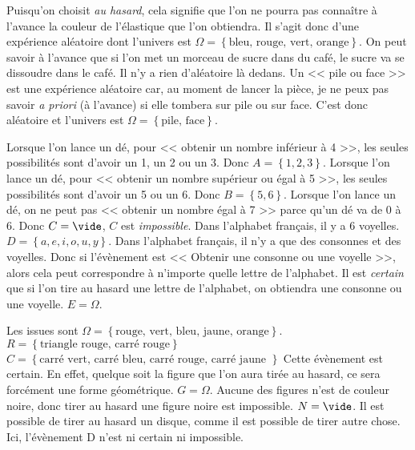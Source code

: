 \documentclass[../Cours.tex]{subfiles}
\begin{document}
\clearpage
\CORRECTIONS
\begin{questions}
    \exercice 
    \question Puisqu'on choisit \textit{au hasard}, cela signifie que l'on ne pourra pas connaître à l'avance la couleur de l'élastique que l'on obtiendra. Il s'agit donc d'une expérience aléatoire dont l'univers est $\Omega = \left\{ \mbox{bleu, rouge, vert, orange} \right\}$.
    \question On peut savoir à l'avance que si l'on met un morceau de sucre dans du café, le sucre va se dissoudre dans le café. Il n'y a rien d'aléatoire là dedans.
    \question Un << pile ou face >> est une expérience aléatoire car, au moment de lancer la pièce, je ne peux pas savoir \textit{a priori} (à l'avance) si elle tombera sur pile ou sur face. C'est donc aléatoire et l'univers est $\Omega = \left\{ \mbox{pile, face} \right\}$.

    \exercice 
    \question 
        \subquestion Lorsque l'on lance un dé, pour << obtenir un nombre inférieur à 4 >>, les seules possibilités sont d'avoir un 1, un 2 ou un 3. Donc $A = \left\{ 1, 2, 3 \right\}$.
        \subquestion Lorsque l'on lance un dé, pour << obtenir un nombre supérieur ou égal à 5 >>, les seules possibilités sont d'avoir un 5 ou un 6. Donc $B = \left\{ 5, 6 \right\}$.
        \subquestion Lorsque l'on lance un dé, on ne peut pas << obtenir un nombre égal à 7 >> parce qu'un dé va de 0 à 6. Donc $C = \vide$, $C$ est \emph{impossible}.
    \question 
        \subquestion Dans l'alphabet français, il y a 6 voyelles. $D = \left\{ a, e, i, o, u, y \right\}$.
        \subquestion Dans l'alphabet français, il n'y a que des consonnes et des voyelles. Donc si l'évènement est << Obtenir une consonne ou une voyelle >>, alors cela peut correspondre à n'importe quelle lettre de l'alphabet. Il est \textit{certain} que si l'on tire au hasard une lettre de l'alphabet, on obtiendra une consonne ou une voyelle. $E = \Omega$.

    \exercice
    \question Les issues sont $\Omega = \left\{ \mbox{rouge, vert, bleu, jaune, orange} \right\}$.
    \question 
        \subquestion $R = \left\{ \mbox{triangle rouge, carré rouge} \right\}$
        \subquestion $C = \left\{ \mbox{carré vert, carré bleu, carré rouge, carré jaune }\right\}$
    \question 
        \subquestion Cette évènement est certain. En effet, quelque soit la figure que l'on aura tirée au hasard, ce sera forcément une forme géométrique. $G=\Omega$.
        \subquestion Aucune des figures n'est de couleur noire, donc tirer au hasard une figure noire est impossible. $N = \vide$.
        \subquestion Il est possible de tirer au hasard un disque, comme il est possible de tirer autre chose. Ici, l'évènement D n'est ni certain ni impossible.


\end{questions}
\end{document}
